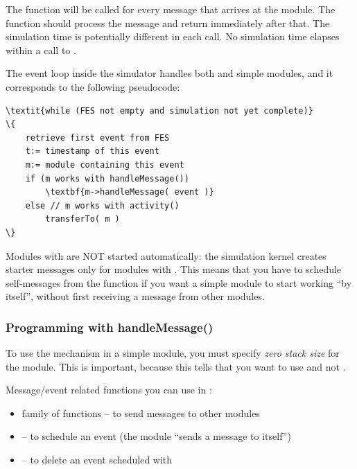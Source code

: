 The  function will be called for every message
that arrives at the module. The function should process the message
and return immediately after that. The simulation time is potentially
different in each call. No simulation time elapses within a call
to .

The event loop inside the simulator handles both 
and  simple modules, and it corresponds
to the following pseudocode:

\begin{Verbatim}[commandchars=\\\{\}]
\textit{while (FES not empty and simulation not yet complete)}
\{
    retrieve first event from FES
    t:= timestamp of this event
    m:= module containing this event
    if (m works with handleMessage())
        \textbf{m->handleMessage( event )}
    else // m works with activity()
        transferTo( m )
\}
\end{Verbatim}

Modules with  are NOT started automatically:
the simulation kernel creates starter messages
only for modules with . This means that you have to
schedule self-messages from the
 function if you want a 
simple module to start working ``by itself'', without first receiving
a message from other modules.


\subsubsection{Programming with handleMessage()}


To use the  mechanism in a
simple module, you must specify \textit{zero
  stack size} for the module. This is
important, because this tells {\opp} that you want to use
 and not .

Message/event related functions you can use in :

\begin{itemize}
  \item{ family of functions -- to send messages to other modules}
  \item{ -- to schedule an event (the module ``sends a message to itself'')}
  \item{ -- to delete an event scheduled with }
\end{itemize}


